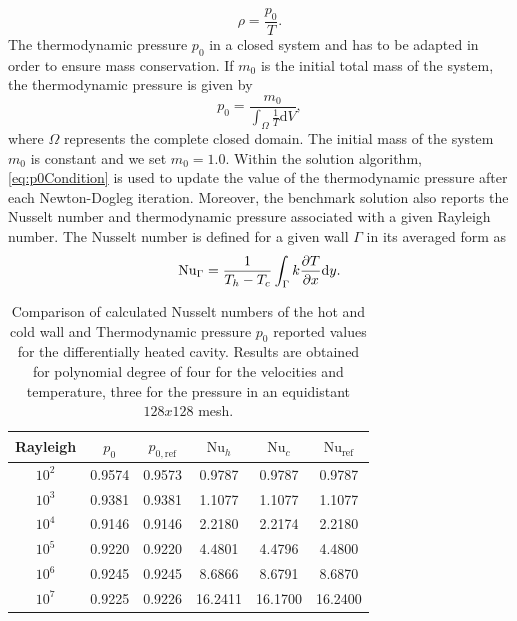 \begin{equation}
	\rho = \frac{p_0}{T}.
\end{equation}
The thermodynamic pressure $p_0$ in a closed system and has to be adapted in order to ensure mass conservation. If $m_0$ is the initial total mass of the system, the thermodynamic pressure is given by
\begin{equation}
	p_0 = \frac{m_0}{\int_\Omega \frac{1}{T}\text{d}V}, \label{eq:p0Condition}
\end{equation}
where $\Omega$ represents the complete closed domain. The initial mass of the system $m_0$ is constant and we set $m_0 = 1.0$. Within the solution algorithm, \cref{eq:p0Condition} is used to update the value of the thermodynamic pressure after each Newton-Dogleg iteration.
Moreover, the benchmark solution \cite{vierendeelsBenchmarkSolutionsNatural2003} also reports the Nusselt number and thermodynamic pressure associated with a given Rayleigh number. The Nusselt number is defined for a given wall $\Gamma$ in its averaged form as
\begin{equation}\label{eq:Nusselt}
	\text{Nu}_\Gamma = \frac{1}{T_h - T_c}\int_{\Gamma} k \frac{\partial T}{\partial x}\text{d}y.
\end{equation}\begin{table}[t]
	\begin{center}
		\begin{tabular}{cccccc}
			\hline
			Rayleigh                           & $p_0$  & $p_{0,\text{ref}}$ & $\text{Nu}_{h}$ & $\text{Nu}_{c}$ & $\text{Nu}_{\text{ref}}$ \\ \hline
			\parbox[0pt][13pt][c]{0pt}{}$10^2$ & 0.9574 & 0.9573             & 0.9787          & 0.9787          & 0.9787                   \\
			$10^3$                             & 0.9381 & 0.9381             & 1.1077          & 1.1077          & 1.1077                   \\
			$10^4$                             & 0.9146 & 0.9146             & 2.2180          & 2.2174          & 2.2180                   \\
			$10^5$                             & 0.9220 & 0.9220             & 4.4801          & 4.4796          & 4.4800                   \\
			$10^6$                             & 0.9245 & 0.9245             & 8.6866          & 8.6791          & 8.6870                   \\
			$10^7$                             & 0.9225 & 0.9226             & 16.2411         & 16.1700         & 16.2400                  \\ \hline
		\end{tabular}
	\end{center}
	\caption[Differentially heated cavity: Results of Nusselt number and Thermodynamic pressure]{Comparison of calculated Nusselt numbers of the hot and cold wall and Thermodynamic pressure $p_0$ reported values\cite{vierendeelsBenchmarkSolutionsNatural2003} for the differentially heated cavity. Results are obtained for polynomial degree of four for the velocities and temperature, three for the pressure in an equidistant $128x128$ mesh.}
	\label{tab:p0_Nu_Results}
\end{table}
